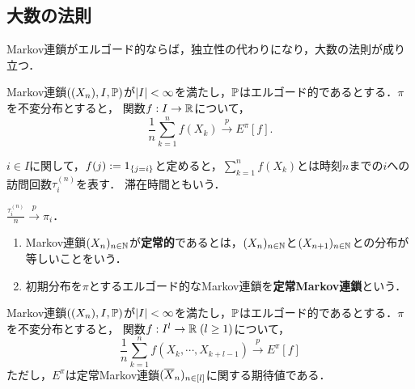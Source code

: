 \documentclass[uplatex,dvipdfmx]{jsreport}
\begin{document}
\subsection{大数の法則}

\begin{tcolorbox}[colframe=ForestGreen, colback=ForestGreen!10!white,breakable,colbacktitle=ForestGreen!40!white,coltitle=black,fonttitle=\bfseries\sffamily,
title=]
    Markov連鎖がエルゴード的ならば，独立性の代わりになり，大数の法則が成り立つ．
\end{tcolorbox}

\begin{theorem}[大数の弱法則]\label{thm-law-of-large-number-of-Markov-chain}
    Markov連鎖$((X_n),I,\mathbb{P})$が$\lvert I\rvert<\infty$を満たし，$\mathbb{P}$はエルゴード的であるとする．$\pi$を不変分布とすると，
    関数$f:I\to\mathbb{R}$について，
    \[\frac{1}{n}\sum_{k=1}^nf(X_k)\xrightarrow{p}E^\pi[f].\]
\end{theorem}

\begin{definition}
    $i\in I$に関して，$f(j):=1_{\left\{j=i\right\}}$と定めると，$\sum^n_{k=1}f(X_k)$とは時刻$n$までの$i$への訪問回数$\tau^{(n)}_i$を表す．
    滞在時間ともいう．
\end{definition}

\begin{corollary}
    $\frac{\tau_i^{(n)}}{n}\xrightarrow{p}\pi_i$．
\end{corollary}

\begin{definition}[stationarity]\mbox{}
    \begin{enumerate}
        \item Markov連鎖$(X_n)_{n\in\mathbb{N}}$が\textbf{定常的}であるとは，$(X_n)_{n\in\mathbb{N}}$と$(X_{n+1})_{n\in\mathbb{N}}$との分布が等しいことをいう．
        \item 初期分布を$\pi$とするエルゴード的なMarkov連鎖を\textbf{定常Markov連鎖}という．
    \end{enumerate}
\end{definition}

\begin{theorem}[高次元化]
    Markov連鎖$((X_n),I,\mathbb{P})$が$\lvert I\rvert<\infty$を満たし，$\mathbb{P}$はエルゴード的であるとする．$\pi$を不変分布とすると，
    関数$f:I^l\to\mathbb{R}\;(l\ge1)$について，
    \[\frac{1}{n}\sum_{k=1}^nf(X_k,\cdots,X_{k+l-1})\xrightarrow{p}E^\pi[f]\]
    ただし，$E^\pi$は定常Markov連鎖$(\overline{X}_n)_{n\in[l]}$に関する期待値である．
\end{theorem}
\end{document}

